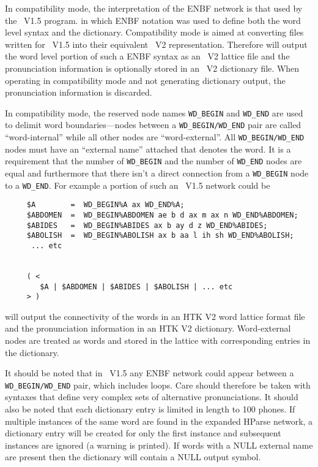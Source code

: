 In  compatibility mode, the interpretation of the 
ENBF network is that used by the \HTK\ V1.5  program.
in which  ENBF notation was used to define both the word 
level syntax and the dictionary.
Compatibility mode is aimed at converting files written for
\HTK\ V1.5 into their equivalent \HTK\ V2 representation.
Therefore  will output the word level
portion of such a ENBF syntax as an \HTK\ V2 lattice file and the
pronunciation information is optionally stored in
an \HTK\ V2 dictionary file. When operating in compatibility mode
and not generating dictionary output, the pronunciation information
is discarded.

In compatibility mode, the reserved
node names \texttt{WD\_BEGIN} and \texttt{WD\_END} are used to delimit word 
boundaries---nodes between a \texttt{WD\_BEGIN/WD\_END} pair are called 
``word-internal'' while all other nodes are  ``word-external''.  
All \texttt{WD\_BEGIN/WD\_END} nodes 
must have an ``external name'' attached that denotes the word. 
It is a requirement that the number of \texttt{WD\_BEGIN} and the number
of \texttt{WD\_END} nodes are equal and furthermore that there isn't
a direct connection from a \texttt{WD\_BEGIN} node to a \texttt{WD\_END}.
For example a portion of such an \HTK\ V1.5  network could be 
\begin{verbatim}
     $A        =  WD_BEGIN%A ax WD_END%A;
     $ABDOMEN  =  WD_BEGIN%ABDOMEN ae b d ax m ax n WD_END%ABDOMEN;
     $ABIDES   =  WD_BEGIN%ABIDES ax b ay d z WD_END%ABIDES;
     $ABOLISH  =  WD_BEGIN%ABOLISH ax b aa l ih sh WD_END%ABOLISH;
      ... etc


     ( < 
        $A | $ABDOMEN | $ABIDES | $ABOLISH | ... etc
     > )
\end{verbatim}
 will output the connectivity of the words 
in an HTK V2 word lattice format file
and the pronunciation information in an HTK V2 dictionary.
Word-external nodes are treated as words and stored in the lattice
with corresponding entries in the dictionary. 

It should be noted that in \HTK\ V1.5 any ENBF network could appear
between a \texttt{WD\_BEGIN/WD\_END} pair, which includes loops.
Care should therefore be taken with syntaxes that define very complex
sets of alternative pronunciations.  It should also be noted
that each dictionary entry is limited in length to 100 phones.
If multiple instances of the same word are found in the expanded
HParse network, a dictionary entry will be created for only the
first instance and subsequent instances are ignored (a warning is
printed). If words with a NULL external name are present then 
the dictionary will contain a NULL output symbol.

